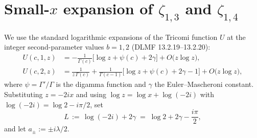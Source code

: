 \documentclass[
 aip,
 jmp,
 amsmath,amssymb,
 reprint,
 nofootinbib,
]{revtex4-2}
\begin{document}
\section{Small-$x$ expansion of $\zeta_{1,3}$ and $\zeta_{1,4}$}

We use the standard logarithmic expansions of the Tricomi function $U$ at the integer second-parameter values $b=1,2$ (DLMF 13.2.19--13.2.20):
\begin{align}
    U(c,1,z) &= -\frac{1}{\Gamma(c)}\Big[\log z + \psi(c) + 2\gamma\Big] + O\!\big(z\log z\big), \label{eq:U-c-1}\\
    U(c,2,z) &= \frac{1}{z\,\Gamma(c)} + \frac{1}{\Gamma(c-1)}\Big[\log z + \psi(c) + 2\gamma - 1\Big] + O\!\big(z\log z\big), \label{eq:U-c-2}
\end{align}
where $\psi=\Gamma'/\Gamma$ is the digamma function and $\gamma$ the Euler--Mascheroni constant. Substituting $z=-2ix$ and using $\log z = \log x + \log(-2i)$ with $\log(-2i)=\log 2 - i\pi/2$, set
\begin{equation}
    L \,:=\, \log(-2i) + 2\gamma \;=\; \log 2 + 2\gamma - \frac{i\pi}{2},
\end{equation}
and let $a_{\pm} := \pm i\lambda/2$.
\end{document}

